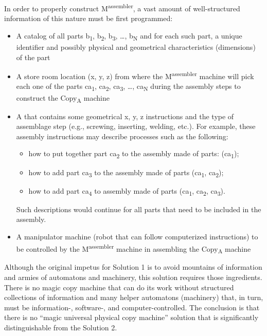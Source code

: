 In order
to properly construct M\textsuperscript{assembler}, a vast amount
of well-structured information of this nature must be first programmed:

\begin{itemize}
\item A catalog of all parts b\textsubscript{1}, b\textsubscript{2},
b\textsubscript{3}, …, b\textsubscript{N} and for each such part, a
unique identifier and possibly physical and geometrical characteristics
(dimensions) of the part
\item A store room location (x, y, z)  from where the
M\textsuperscript{assembler} machine will pick each one of the parts
ca\textsubscript{1}, ca\textsubscript{2}, ca\textsubscript{3}, …,
ca\textsubscript{N} during the assembly steps to construct the
Copy\textsubscript{A} machine
\item A  that contains some geometrical x,
y, z instructions and the type of assemblage step (e.g., screwing,
inserting, welding, etc.).  For example, these assembly instructions may describe processes such as the following:

\begin{itemize}
\item how to put together part ca\textsubscript{2} to the assembly made
of parts: (ca\textsubscript{1});
\item how to add part ca\textsubscript{3} to the assembly made of parts
(ca\textsubscript{1}, ca\textsubscript{2});
\item how to add part ca\textsubscript{4} to assembly made of parts
(ca\textsubscript{1}, ca\textsubscript{2}, ca\textsubscript{3}).
\end{itemize}

Such descriptions would continue for all parts that need to be included in the assembly.

\item A manipulator machine (robot that can follow computerized
instructions) to be controlled by the M\textsuperscript{assembler}
machine in assembling the Copy\textsubscript{A} machine
\end{itemize}

Although the original impetus for Solution 1 is to avoid mountains of
information and armies of automatons and machinery, 
this solution requires those ingredients. 
There is no magic copy machine that can do its work without structured
collections of information and many helper automatons (machinery) that,
in turn, must be information-, software-, and computer-controlled.  
The conclusion is that there is no ``magic universal physical copy machine'' solution
that is significantly distinguishable from the Solution 2. 

